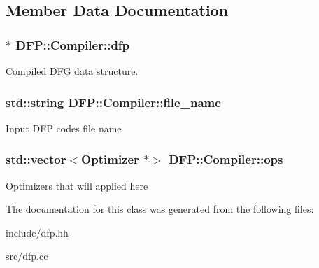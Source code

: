 \subsection{Member Data Documentation}
\subsubsection[{\texorpdfstring{dfp}{dfp}}]{$\ast$ D\+F\+P\+::\+Compiler\+::dfp}\hypertarget{class_d_f_p_1_1_compiler_aba7a515032df6ac78a634d71e7cf41c6}{}\label{class_d_f_p_1_1_compiler_aba7a515032df6ac78a634d71e7cf41c6}
Compiled D\+FG data structure. 
\subsubsection[{\texorpdfstring{file\+\_\+name}{file_name}}]{\setlength{\rightskip}{0pt plus 5cm}std\+::string D\+F\+P\+::\+Compiler\+::file\+\_\+name}\hypertarget{class_d_f_p_1_1_compiler_a1c91460b5beaebb3f657eeb639734f35}{}\label{class_d_f_p_1_1_compiler_a1c91460b5beaebb3f657eeb639734f35}
Input D\+FP codes file name 
\subsubsection[{\texorpdfstring{ops}{ops}}]{\setlength{\rightskip}{0pt plus 5cm}std\+::vector$<${\bf Optimizer} $\ast$$>$ D\+F\+P\+::\+Compiler\+::ops}\hypertarget{class_d_f_p_1_1_compiler_a6f14e4f15a69a0f4c3d2c9327d60c0a5}{}\label{class_d_f_p_1_1_compiler_a6f14e4f15a69a0f4c3d2c9327d60c0a5}
Optimizers that will applied here 

The documentation for this class was generated from the following files\+:\begin{DoxyCompactItemize}
\item 
include/dfp.\+hh\item 
src/dfp.\+cc\end{DoxyCompactItemize}
